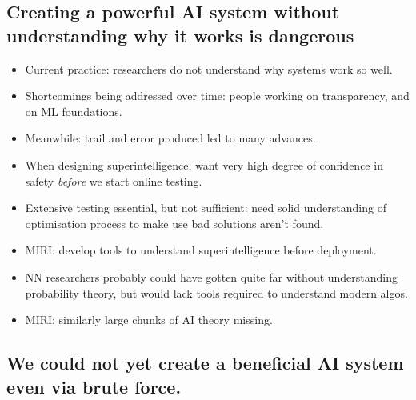 \subsection{Creating a powerful AI system without understanding why it works is dangerous}

\begin{itemize}
    \item Current practice: researchers do not understand why systems work so well.
    \item Shortcomings being addressed over time: people working on transparency, and on ML foundations.
    \item Meanwhile: trail and error produced led to many advances.
    \item When designing superintelligence, want very high degree of confidence in safety \emph{before} we start online testing.
    \item Extensive testing essential, but not sufficient: need solid understanding of optimisation process to make use bad solutions aren't found.
    \item MIRI: develop tools to understand superintelligence before deployment.
    \item NN researchers probably could have gotten quite far without understanding probability theory, but would lack tools required to understand modern algos.
    \item MIRI: similarly large chunks of AI theory missing.
\end{itemize}


\subsection{We could not yet create a beneficial AI system even via brute force.}

